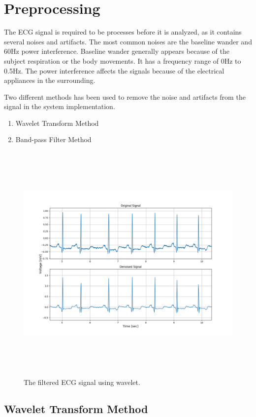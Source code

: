 \section{Preprocessing}
The ECG signal is required to be processes before it is analyzed, as it contains several noises and artifacts. The most common noises are the baseline wander and 60Hz power interference. Baseline wander generally appears because of the subject respiration or the body movements. It has a frequency range of 0Hz to 0.5Hz. The power interference affects the signals because of the electrical appliances in the surrounding.

Two different methods has been used to remove the noise and artifacts from the signal in the system implementation.
 
 \begin{enumerate}
 	\item Wavelet Transform Method
 	\item Band-pass Filter Method
 \end{enumerate}

\begin{figure}[h]
	\centering
	\includegraphics[width=15cm,height=12cm,keepaspectratio=true]{images/wavelet_denoised_1}
	\caption{
		The filtered ECG signal using wavelet.
	}
	\label{fig:wavelet_denoised}
\end{figure}


\subsection{Wavelet Transform Method}

